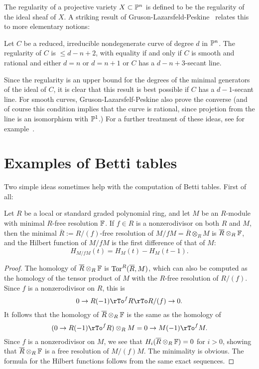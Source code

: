 The regularity of a projective variety $X\subset {\mathbb P}^{n}$ is  defined to be the regularity of the ideal sheaf of $X$. A striking result of Gruson-Lazarsfeld-Peskine~\cite{} relates this to more elementary notions:

\begin{theorem}\label{GLP}
 Let $C$ be a reduced, irreducible nondegenerate curve of degree $d$ in ${\mathbb P}^{n}$. The regularity of $C$ is $\leq d-n+2$, with equality if and only if $C$ is smooth and rational and either $d=n$ or $d=n+1$ or $C$ has a $d-n+3$-secant line. 
 \end{theorem}
 
Since the regularity is an upper bound for the degrees of the minimal generators of the ideal of $C$, it is clear that this result is best possible if $C$ has a $d-1$-secant line. For smooth curves, Gruson-Lazarsfelf-Peskine also prove the converse (and of course this condition implies that the curve is rational, since projetion from the line is an isomorphism with ${\mathbb P}^{1}$.)
For a further treatment of these ideas, see for example~\cite{geomsyz}.

\section{Examples of Betti tables}
Two simple ideas sometimes help with the computation of Betti tables. First of all:

\begin{proposition}\label{reduction modulo a nzd}
Let $R$ be a local or standard graded polynomial ring, and let 
$M$ be an $R$-module with minimal $R$-free resolution ${\mathbb F}$.
If $f\in R$ is a nonzerodivisor on both $R$ and $M$, then the minimal $\overline R:=R/(f)$-free resolution of
$M/fM = \overline R \otimes_{R}M$ is $\overline R \otimes_{R}{\mathbb F}$, and the Hilbert function of $M/fM$ is
the first difference of that of $M$:  
$$
H_{M/fM}(t) = H_{M}(t) - H_{M}(t-1).
$$
\end{proposition}
\begin{proof}
 The homology of $\overline R \otimes_{R}{\mathbb F}$ is $\operatorname{Tor}^{R}(\overline R,M)$, which can also be computed as the homology of the tensor product of $M$ with the $R$-free resolution of $R/(f)$. Since $f$ is a nonzerodivisor on $R$, this is
$$
0\to R(-1)\rTo^{f} R \rTo R/(f) \to 0.
$$
It follows that the homology of $\overline R \otimes_{R}{\mathbb F}$ is the same as the homology of
$$
(0\to R(-1)\rTo^{f} R)\otimes_{R}M  = 0\to M(-1)\rTo^{f} M.
$$
Since $f$ is a nonzerodivisor on $M$, we see that $H_{i}( \overline R \otimes_{R}{\mathbb F}) = 0$ for $i>0$, showing that $\overline R \otimes_{R}{\mathbb F}$
is a free resolution of $M/(f)M$. The minimality is obvious. The formula for the Hilbert functions follows from the same exact sequences.
\end{proof}

